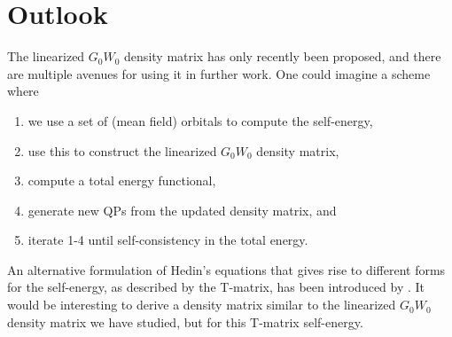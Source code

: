 \documentclass[12pt]{caltech_thesis}
\begin{document}
\chapter{Outlook}
The linearized $G_0W_0$ density matrix has only recently been proposed, and there are multiple avenues for using it in further work. One could imagine a scheme where
\begin{enumerate}
    \item we use a set of (mean field) orbitals to compute the self-energy,
    \item use this to construct the linearized $G_0W_0$ density matrix,
    \item compute a total energy functional,
    \item generate new QPs from the updated density matrix, and
    \item iterate 1-4 until self-consistency in the total energy.
\end{enumerate}
 An alternative formulation of Hedin's equations that gives rise to different forms for the self-energy, as described by the T-matrix, has been introduced by \textcite{Orlando_2023}. It would be interesting to derive a density matrix similar to the linearized $G_0W_0$ density matrix we have studied, but for this T-matrix self-energy.

\printbibliography[heading=bibintoc]

\appendix
\end{document}
